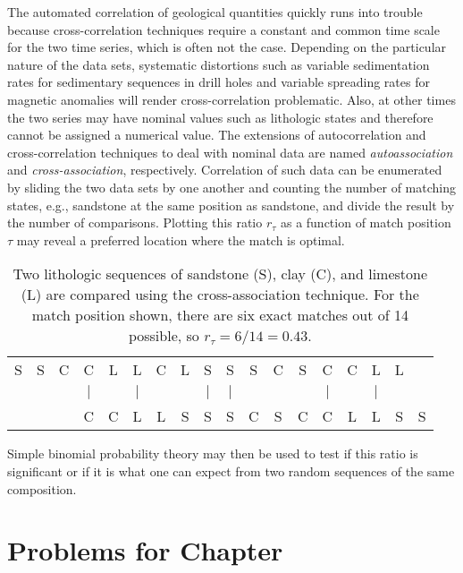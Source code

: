 	The automated correlation of geological quantities quickly runs into trouble because
cross-correlation techniques require a constant and common time scale for the two time series, which is 
often not the case.  Depending on the particular nature of the data sets, systematic 
distortions such as variable sedimentation rates for sedimentary sequences in drill holes and variable 
spreading rates for magnetic anomalies will render cross-correlation problematic.  Also, at other times the 
two series may have nominal values such as lithologic states and therefore cannot be assigned a numerical 
value.  The extensions of autocorrelation and cross-correlation techniques to deal with nominal 
data are named \emph{autoassociation} and \emph{cross-association}, respectively.
Correlation of such data can be enumerated by sliding
the two data sets by one another and counting the number of matching states, e.g., 
sandstone at the same position as sandstone, and divide the result by the number of comparisons.  
Plotting this ratio $r_\tau$ as a function of match position $\tau$ may reveal a preferred location where the 
match is optimal.  
\begin{table}[h]
\center
\begin{tabular}{cccccccccccccccccc}
S & S & C & C   & L &  L  & C & L &  S  &  S  & S & C & S &  C &  C &  L  & L & \\
  &   &   & $|$ &   & $|$ &   &   & $|$ & $|$ &   &   &   & $|$ &   & $|$ &   &  \\   
  &   &   & C   & C &  L  & L & S &  S  &  S  & C & S & C &  C &  L &  L  & S & S  \\
\end{tabular}
\label{tbl:cross_assoc}
\caption{Two lithologic sequences of sandstone (S), clay (C), and limestone (L) are compared using the cross-association 
technique.  For the match position shown, there are six exact matches out of 14 possible, so $r_\tau = 6/14 = 0.43$.}
\end{table}

Simple binomial probability theory may then be used to test if this ratio is significant or if it is what one can 
expect from two random sequences of the same composition.

\clearpage
\section{Problems for Chapter \thechapter}

